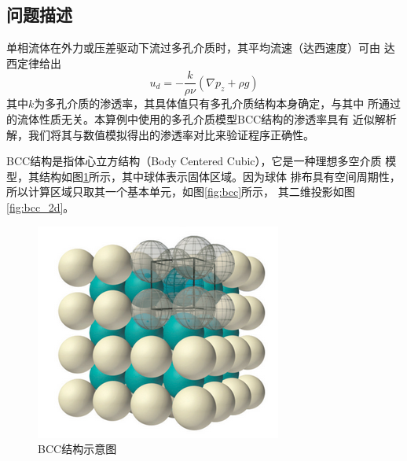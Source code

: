 \subsection{问题描述}
单相流体在外力或压差驱动下流过多孔介质时，其平均流速（达西速度）可由
达西定律给出
\begin{equation}
  u_d = -\frac{k}{\rho \nu}(\nabla p_z + \rho g)
  \label{darcy}
\end{equation}
其中$k$为多孔介质的渗透率，其具体值只有多孔介质结构本身确定，与其中
所通过的流体性质无关。本算例中使用的多孔介质模型BCC结构的渗透率具有
近似解析解，我们将其与数值模拟得出的渗透率对比来验证程序正确性。

BCC结构是指体心立方结构（Body Centered Cubic），它是一种理想多空介质
模型，其结构如图\ref{fig:bcc_array}所示，其中球体表示固体区域。因为球体
排布具有空间周期性，所以计算区域只取其一个基本单元，如图\ref{fig:bcc}所示，
其二维投影如图\ref{fig:bcc_2d}。
\begin{figure}[htpb]
  \centering
  \includegraphics[]{img/bcc_array}
  \caption{BCC结构示意图}
  \label{fig:bcc_array}
\end{figure}

